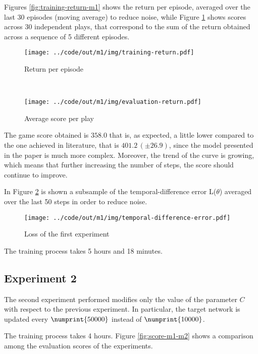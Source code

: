 \documentclass[a4paper,12pt]{article} %
\begin{document}
	Figures \ref{fig:training-return-m1} shows the return per episode, averaged over the last 30 episodes (moving average) to reduce noise, while Figure \ref{fig:evaluation-return-m1} shows scores across 30 independent plays, that correspond to the sum of the return obtained across a sequence of 5 different episodes.
	
	\begin{figure}[htb]
		\begin{minipage}[b]{.49\textwidth}
			\centering
			\texttt{[image: ../code/out/m1/img/training-return.pdf]}	
			\caption{Return per episode}
			\label{fig:training-return-m1}
		\end{minipage}
		~
		\begin{minipage}[b]{.49\textwidth}
			\centering
			\texttt{[image: ../code/out/m1/img/evaluation-return.pdf]}	
			\caption{Average score per play}
			\label{fig:evaluation-return-m1}
		\end{minipage}
	\end{figure}

	The game score obtained is $358.0$ that is, as expected, a little lower compared to the one achieved in literature, that is $401.2 \, (\pm 26.9)$, since the model presented in the paper is much more complex.
	Moreover, the trend of the curve is growing, which means that further increasing the number of steps, the score should continue to improve.
	\bigskip
		
	In Figure \ref{fig:loss-m1} is shown a subsample of the temporal-difference error L($\theta$) averaged over the last 50 steps in order to reduce noise.
	
	\begin{figure}[htb]
		\centering
		\texttt{[image: ../code/out/m1/img/temporal-difference-error.pdf]}	
		\caption{Loss of the first experiment}
		\label{fig:loss-m1}
	\end{figure} 

	\bigskip
	The training process takes 5 hours and 18 minutes.
	
	\subsection*{Experiment 2}
	The second experiment performed modifies only the value of the parameter $C$ with respect to the previous experiment. In particular, the target network is updated every $\numprint{50000}$ instead of $\numprint{10000}$.
	
	The training process takes 4 hours. Figure \ref{fig:score-m1-m2} shows a comparison among the evaluation scores of the experiments.
	
\end{document}
